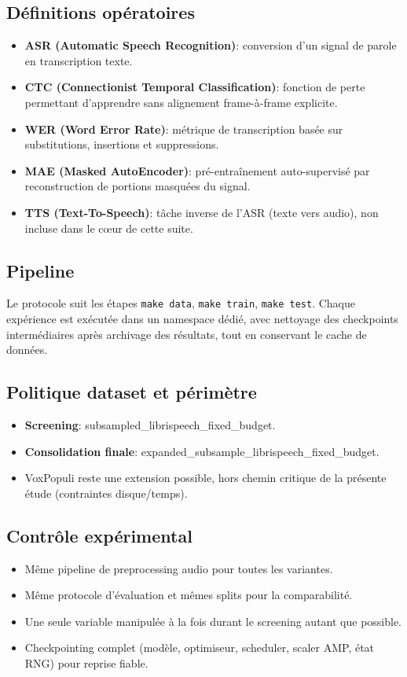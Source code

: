 \documentclass[11pt,a4paper]{article}
\begin{document}
\subsection{Définitions opératoires}
\begin{itemize}
\item \textbf{ASR (Automatic Speech Recognition)}: conversion d'un signal de parole en transcription texte.
\item \textbf{CTC (Connectionist Temporal Classification)}: fonction de perte permettant d'apprendre sans alignement frame-à-frame explicite.
\item \textbf{WER (Word Error Rate)}: métrique de transcription basée sur substitutions, insertions et suppressions.
\item \textbf{MAE (Masked AutoEncoder)}: pré-entraînement auto-supervisé par reconstruction de portions masquées du signal.
\item \textbf{TTS (Text-To-Speech)}: tâche inverse de l'ASR (texte vers audio), non incluse dans le cœur de cette suite.
\end{itemize}

\subsection{Pipeline}
Le protocole suit les étapes \texttt{make data}, \texttt{make train}, \texttt{make test}.
Chaque expérience est exécutée dans un namespace dédié, avec nettoyage des checkpoints intermédiaires après archivage des résultats, tout en conservant le cache de données.

\subsection{Politique dataset et périmètre}
\begin{itemize}
\item \textbf{Screening}: subsampled\_librispeech\_fixed\_budget.
\item \textbf{Consolidation finale}: expanded\_subsample\_librispeech\_fixed\_budget.
\item VoxPopuli reste une extension possible, hors chemin critique de la présente étude (contraintes disque/temps).
\end{itemize}

\subsection{Contrôle expérimental}
\begin{itemize}
\item Même pipeline de preprocessing audio pour toutes les variantes.
\item Même protocole d'évaluation et mêmes splits pour la comparabilité.
\item Une seule variable manipulée à la fois durant le screening autant que possible.
\item Checkpointing complet (modèle, optimiseur, scheduler, scaler AMP, état RNG) pour reprise fiable.
\end{itemize}
\end{document}
